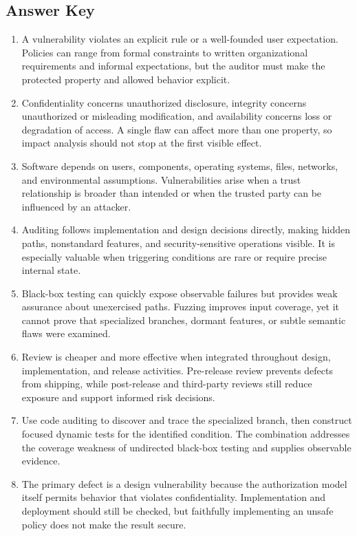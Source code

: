 \documentclass[11pt,letterpaper]{article}
\begin{document}
\subsection*{Answer Key}
\begin{enumerate}
\item A vulnerability violates an explicit rule or a well-founded user expectation. Policies can range from formal constraints to written organizational requirements and informal expectations, but the auditor must make the protected property and allowed behavior explicit.
\item Confidentiality concerns unauthorized disclosure, integrity concerns unauthorized or misleading modification, and availability concerns loss or degradation of access. A single flaw can affect more than one property, so impact analysis should not stop at the first visible effect.
\item Software depends on users, components, operating systems, files, networks, and environmental assumptions. Vulnerabilities arise when a trust relationship is broader than intended or when the trusted party can be influenced by an attacker.
\item Auditing follows implementation and design decisions directly, making hidden paths, nonstandard features, and security-sensitive operations visible. It is especially valuable when triggering conditions are rare or require precise internal state.
\item Black-box testing can quickly expose observable failures but provides weak assurance about unexercised paths. Fuzzing improves input coverage, yet it cannot prove that specialized branches, dormant features, or subtle semantic flaws were examined.
\item Review is cheaper and more effective when integrated throughout design, implementation, and release activities. Pre-release review prevents defects from shipping, while post-release and third-party reviews still reduce exposure and support informed risk decisions.
\item Use code auditing to discover and trace the specialized branch, then construct focused dynamic tests for the identified condition. The combination addresses the coverage weakness of undirected black-box testing and supplies observable evidence.
\item The primary defect is a design vulnerability because the authorization model itself permits behavior that violates confidentiality. Implementation and deployment should still be checked, but faithfully implementing an unsafe policy does not make the result secure.
\end{enumerate}
\end{document}
